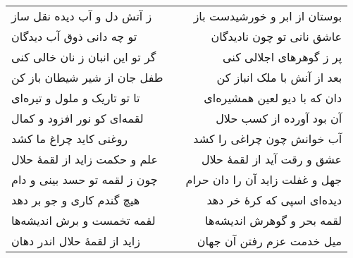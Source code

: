 \begin{center}
\begin{longtable}{l p{0.5cm} r}
ز آتش دل و آب دیده نقل ساز
&&
بوستان از ابر و خورشیدست باز
\\
تو چه دانی ذوق آب دیدگان
&&
عاشق نانی تو چون نادیدگان
\\
گر تو این انبان ز نان خالی کنی
&&
پر ز گوهرهای اجلالی کنی
\\
طفل جان از شیر شیطان باز کن
&&
بعد از آنش با ملک انباز کن
\\
تا تو تاریک و ملول و تیره‌ای
&&
دان که با دیو لعین همشیره‌ای
\\
لقمه‌ای کو نور افزود و کمال
&&
آن بود آورده از کسب حلال
\\
روغنی کاید چراغ ما کشد
&&
آب خوانش چون چراغی را کشد
\\
علم و حکمت زاید از لقمهٔ حلال
&&
عشق و رقت آید از لقمهٔ حلال
\\
چون ز لقمه تو حسد بینی و دام
&&
جهل و غفلت زاید آن را دان حرام
\\
هیچ گندم کاری و جو بر دهد
&&
دیده‌ای اسپی که کرهٔ خر دهد
\\
لقمه تخمست و برش اندیشه‌ها
&&
لقمه بحر و گوهرش اندیشه‌ها
\\
زاید از لقمهٔ حلال اندر دهان
&&
میل خدمت عزم رفتن آن جهان
\\
\end{longtable}
\end{center}
